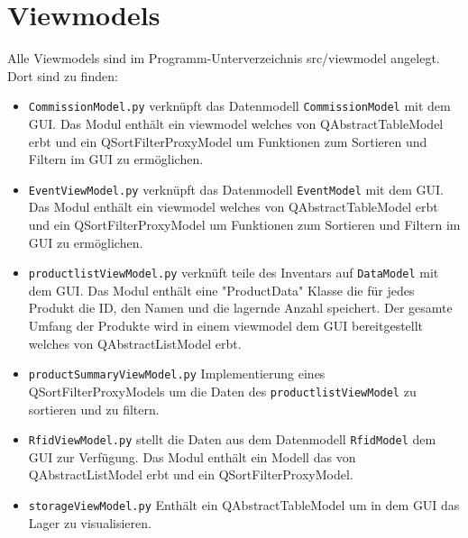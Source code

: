 \section{Viewmodels}
Alle Viewmodels sind im Programm-Unterverzeichnis \glqq src/viewmodel \grqq angelegt. Dort sind zu finden: 
\begin{itemize}
    \item \verb|CommissionModel.py| verknüpft das Datenmodell \verb|CommissionModel| mit dem GUI. Das Modul enthält ein viewmodel welches von QAbstractTableModel erbt und ein QSortFilterProxyModel um Funktionen zum Sortieren und Filtern im GUI zu ermöglichen.
    \item \verb|EventViewModel.py| verknüpft das Datenmodell \verb|EventModel| mit dem GUI. Das Modul enthält ein viewmodel welches von QAbstractTableModel erbt und ein QSortFilterProxyModel um Funktionen zum Sortieren und Filtern im GUI zu ermöglichen.
    \item \verb|productlistViewModel.py| verknüft teile des Inventars auf \verb|DataModel| mit dem GUI. Das Modul enthält eine "ProductData" Klasse die für jedes Produkt die ID, den Namen und die lagernde Anzahl speichert. Der gesamte Umfang der Produkte wird in einem viewmodel dem GUI bereitgestellt welches von QAbstractListModel erbt. 
    \item \verb|productSummaryViewModel.py| Implementierung eines QSortFilterProxyModels um die Daten des \verb|productlistViewModel| zu sortieren und zu filtern.
    \item \verb|RfidViewModel.py| stellt die Daten aus dem Datenmodell \verb|RfidModel| dem GUI zur Verfügung. Das Modul enthält ein Modell das von QAbstractListModel erbt und ein QSortFilterProxyModel.
    \item \verb|storageViewModel.py| Enthält ein QAbstractTableModel um in dem GUI das Lager zu visualisieren. 
\end{itemize}
